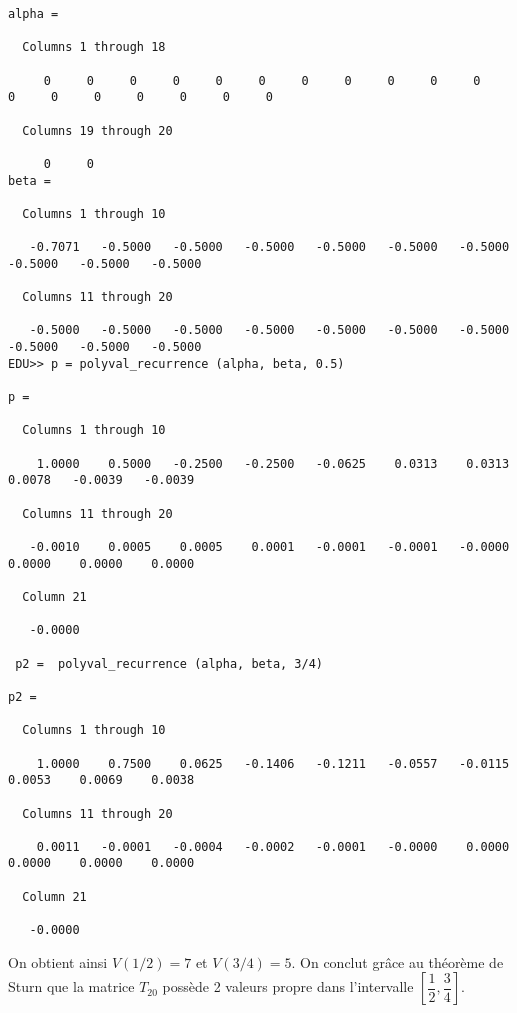 \documentclass{article}
\begin{document}
\begin{verbatim}
alpha =

  Columns 1 through 18

     0     0     0     0     0     0     0     0     0     0     0     0     0     0     0     0     0     0

  Columns 19 through 20

     0     0
beta =

  Columns 1 through 10

   -0.7071   -0.5000   -0.5000   -0.5000   -0.5000   -0.5000   -0.5000   -0.5000   -0.5000   -0.5000

  Columns 11 through 20

   -0.5000   -0.5000   -0.5000   -0.5000   -0.5000   -0.5000   -0.5000   -0.5000   -0.5000   -0.5000
EDU>> p = polyval_recurrence (alpha, beta, 0.5)

p =

  Columns 1 through 10

    1.0000    0.5000   -0.2500   -0.2500   -0.0625    0.0313    0.0313    0.0078   -0.0039   -0.0039

  Columns 11 through 20

   -0.0010    0.0005    0.0005    0.0001   -0.0001   -0.0001   -0.0000    0.0000    0.0000    0.0000

  Column 21

   -0.0000

 p2 =  polyval_recurrence (alpha, beta, 3/4)

p2 =

  Columns 1 through 10

    1.0000    0.7500    0.0625   -0.1406   -0.1211   -0.0557   -0.0115    0.0053    0.0069    0.0038

  Columns 11 through 20

    0.0011   -0.0001   -0.0004   -0.0002   -0.0001   -0.0000    0.0000    0.0000    0.0000    0.0000

  Column 21

   -0.0000
\end{verbatim}

On obtient ainsi $V(1/2) = 7$ et $V(3/4) = 5$. On conclut grâce au théorème de Sturn que la matrice $T_{20}$ possède 2 valeurs propre dans l'intervalle $\left[ \dfrac{1}{2} , \dfrac{3}{4} \right]$. 
\end{document}
